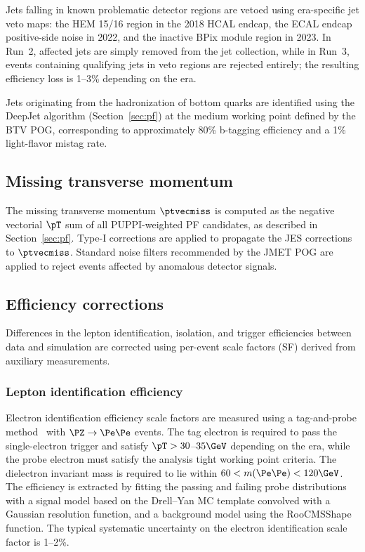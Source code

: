 Jets falling in known problematic detector regions are vetoed using era-specific jet veto maps: the HEM 15/16 region in the 2018 HCAL endcap, the ECAL endcap positive-side noise in 2022, and the inactive BPix module region in 2023. In Run~2, affected jets are simply removed from the jet collection, while in Run~3, events containing qualifying jets in veto regions are rejected entirely; the resulting efficiency loss is 1--3\% depending on the era.

Jets originating from the hadronization of bottom quarks are identified using the DeepJet algorithm (Section~\ref{sec:pf}) at the medium working point defined by the BTV POG, corresponding to approximately 80\% b-tagging efficiency and a 1\% light-flavor mistag rate.

\subsection{Missing transverse momentum}
\label{ssec:met}

The missing transverse momentum $\ptvecmiss$ is computed as the negative vectorial $\pT$ sum of all PUPPI-weighted PF candidates, as described in Section~\ref{sec:pf}. Type-I corrections are applied to propagate the JES corrections to $\ptvecmiss$. Standard noise filters recommended by the JMET POG are applied to reject events affected by anomalous detector signals.

\subsection{Efficiency corrections}
\label{ssec:eff_corrections}

Differences in the lepton identification, isolation, and trigger efficiencies between data and simulation are corrected using per-event scale factors (SF) derived from auxiliary measurements.

\subsubsection*{Lepton identification efficiency}

Electron identification efficiency scale factors are measured using a tag-and-probe method~\cite{CMS:2011aa} with $\PZ \to \Pe\Pe$ events. The tag electron is required to pass the single-electron trigger and satisfy $\pT > 30$--$35\GeV$ depending on the era, while the probe electron must satisfy the analysis tight working point criteria. The dielectron invariant mass is required to lie within $60 < m(\Pe\Pe) < 120\GeV$. The efficiency is extracted by fitting the passing and failing probe distributions with a signal model based on the Drell--Yan MC template convolved with a Gaussian resolution function, and a background model using the RooCMSShape function. The typical systematic uncertainty on the electron identification scale factor is 1--2\%.

